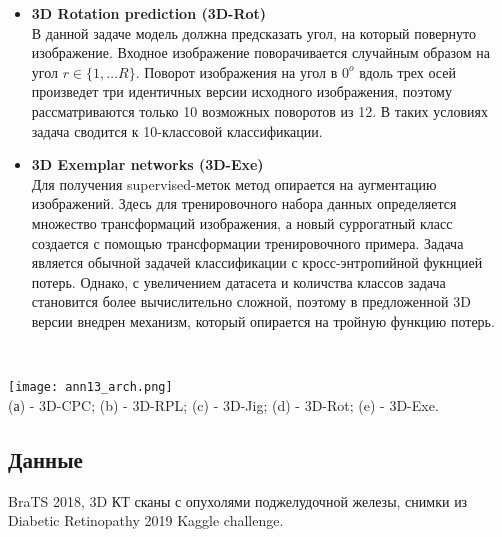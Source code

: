 \begin{itemize}
    \item \textbf{3D Rotation prediction (3D-Rot)} \\
    В данной задаче модель должна предсказать угол, на который повернуто изображение.
    Входное изображение поворачивается случайным образом на угол \(r\in \{1, \dots R\}\).
    Поворот изображения на угол в \(0^{o}\) вдоль трех осей произведет три идентичных версии
    исходного изображения, поэтому рассматриваются только 10 возможных поворотов из 12. 
    В таких условиях задача сводится к 10-классовой классификации.

    \item \textbf{3D Exemplar networks (3D-Exe)} \\
    Для получения supervised-меток метод опирается на аугментацию изображений. 
    Здесь для тренировочного набора данных определяется множество трансформаций 
    изображения, а новый суррогатный класс создается с помощью трансформации тренировочного 
    примера. Задача является обычной задачей классификации с кросс-энтропийной фукнцией потерь.
    Однако, с увеличением датасета и количства классов задача становится более вычислительно сложной, 
    поэтому в предложенной 3D версии внедрен механизм, который опирается на тройную
    функцию потерь.
\end{itemize}

\\
\begin{minipage}{1.0\linewidth}
    \begin{center}
        \texttt{[image: ann13\_arch.png]} \\
        \caption{\scriptsize{(а) - 3D-CPC; (b) - 3D-RPL; (c) - 3D-Jig; (d) - 3D-Rot; (e) - 3D-Exe.}}
    \end{center}
    
\end{minipage}

\subsection*{Данные}
BraTS 2018, 3D КТ сканы с опухолями поджелудочной железы, снимки из Diabetic Retinopathy 2019 Kaggle
challenge.

